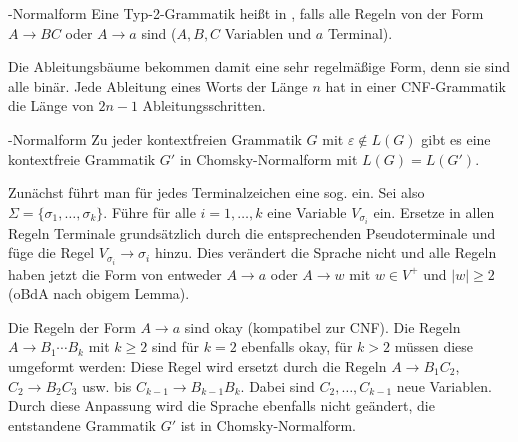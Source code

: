 \linie
\pagebreak

\begin{Def}{-Normalform}
    Eine Typ-2-Grammatik heißt in , falls
    alle Regeln von der Form $A \rightarrow BC$ oder $A \rightarrow a$ sind
    ($A, B, C$ Variablen und $a$ Terminal).
\end{Def}

\begin{Bem}
    Die Ableitungsbäume bekommen damit eine sehr regelmäßige Form, denn sie
    sind alle binär.
    Jede Ableitung eines Worts der Länge $n$ hat in einer CNF-Grammatik
    die Länge von $2n - 1$ Ableitungsschritten.
\end{Bem}

\begin{Satz}{-Normalform}
    Zu jeder kontextfreien Grammatik $G$ mit $\varepsilon \notin L(G)$ gibt
    es eine kontextfreie Grammatik $G'$ in Chomsky-Normalform mit
    $L(G) = L(G')$.
\end{Satz}

\begin{Beweis}
    Zunächst führt man für jedes Terminalzeichen eine sog.
     ein.
    Sei also $\Sigma = \{\sigma_1, \dotsc, \sigma_k\}$.
    Führe für alle $i = 1, \dotsc, k$ eine Variable $V_{\sigma_i}$ ein.
    Ersetze in allen Regeln Terminale grundsätzlich durch die entsprechenden
    Pseudoterminale und füge die Regel $V_{\sigma_i} \rightarrow \sigma_i$
    hinzu.
    Dies verändert die Sprache nicht und alle Regeln haben jetzt die Form
    von entweder $A \rightarrow a$ oder $A \rightarrow w$ mit
    $w \in V^+$ und $|w| \ge 2$
    (oBdA nach obigem Lemma).
    
    Die Regeln der Form $A \rightarrow a$ sind okay (kompatibel zur CNF).
    Die Regeln $A \rightarrow B_1 \dotsb B_k$ mit $k \ge 2$ sind
    für $k = 2$ ebenfalls okay, für $k > 2$ müssen diese umgeformt werden:
    Diese Regel wird ersetzt durch die Regeln
    $A \rightarrow B_1 C_2$, $C_2 \rightarrow B_2 C_3$ usw. bis
    $C_{k-1} \rightarrow B_{k-1} B_k$.
    Dabei sind $C_2, \dotsc, C_{k-1}$ neue Variablen.
    Durch diese Anpassung wird die Sprache ebenfalls nicht geändert,
    die entstandene Grammatik $G'$ ist in Chomsky-Normalform.
\end{Beweis}

